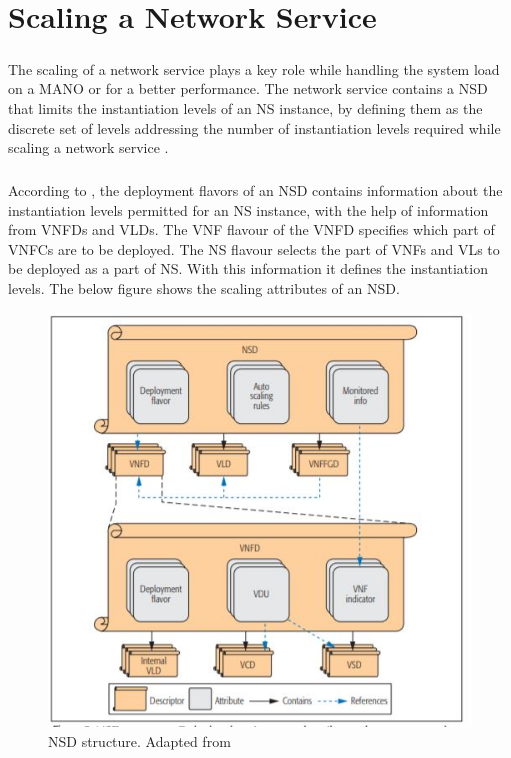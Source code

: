 \chapter{Scaling a Network Service}
\label{ch:Scaling a Network Service}

\paragraph{}The scaling of a network service plays a key role while handling the system load on a MANO or for a better performance. The network service contains a NSD that limits the instantiation levels of an NS instance, by defining them as the discrete set of levels addressing the number of instantiation levels required while scaling a network service \cite{adamuz2018automated}.

\paragraph{}According to \cite{adamuz2018automated}, the deployment flavors of an NSD contains information about the instantiation levels permitted for an NS instance, with the help of information from VNFDs and VLDs. The VNF flavour of the VNFD specifies which part of VNFCs are to be deployed. The NS flavour selects the part of VNFs and VLs to be deployed as a part of NS. With this information it defines the instantiation levels. The below figure shows the scaling attributes of an NSD.

\begin{figure} [H]
	\centering
	\includegraphics[width=0.6\linewidth]{"figures/NSD structure"}
	\caption{NSD structure. Adapted from \cite{adamuz2018automated}}
	\label{fig:nsd-structure}
\end{figure}




